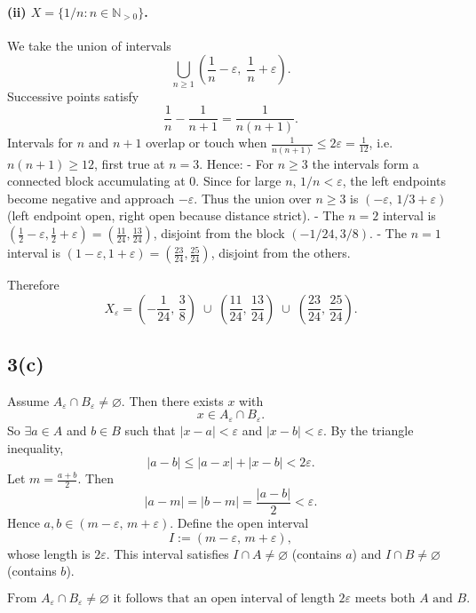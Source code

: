 \documentclass[12pt,a4paper]{article}
\theoremstyle{definition}
\theoremstyle{remark}
\begin{document}
\paragraph{(ii) \(X = \{1/n : n\in\mathbb{N}_{>0}\}\).}
We take the union of intervals
\[
\bigcup_{n\ge 1} \left( \frac{1}{n} - \varepsilon,\; \frac{1}{n} + \varepsilon \right).
\]
Successive points satisfy
\[
\frac{1}{n} - \frac{1}{n+1} = \frac{1}{n(n+1)}.
\]
Intervals for \(n\) and \(n+1\) overlap or touch when \(\frac{1}{n(n+1)} \le 2\varepsilon = \frac{1}{12}\), i.e. \(n(n+1)\ge 12\), first true at \(n=3\).
Hence:
- For \(n\ge 3\) the intervals form a connected block accumulating at \(0\). Since for large \(n\), \(1/n < \varepsilon\), the left endpoints become negative and approach \(-\varepsilon\). Thus the union over \(n\ge 3\) is \((- \varepsilon,\, 1/3 + \varepsilon)\) (left endpoint open, right open because distance strict).
- The \(n=2\) interval is \(\left(\frac{1}{2}-\varepsilon,\frac{1}{2}+\varepsilon\right) = \left(\frac{11}{24},\frac{13}{24}\right)\), disjoint from the block \((-1/24, 3/8)\).
- The \(n=1\) interval is \(\left(1-\varepsilon,1+\varepsilon\right) = \left(\frac{23}{24},\frac{25}{24}\right)\), disjoint from the others.

Therefore
\[
X_\varepsilon = \left(-\frac{1}{24},\,\frac{3}{8}\right) \;\cup\; \left(\frac{11}{24},\,\frac{13}{24}\right) \;\cup\; \left(\frac{23}{24},\,\frac{25}{24}\right).
\]

\subsection*{3(c)}
Assume \(A_\varepsilon \cap B_\varepsilon \neq \varnothing\). Then there exists \(x\) with
\[
x \in A_\varepsilon \cap B_\varepsilon.
\]
So \(\exists a\in A\) and \(b\in B\) such that \(|x-a|<\varepsilon\) and \(|x-b|<\varepsilon\). By the triangle inequality,
\[
|a-b| \le |a-x| + |x-b| < 2\varepsilon.
\]
Let \(m = \frac{a+b}{2}\). Then
\[
|a-m| = |b-m| = \frac{|a-b|}{2} < \varepsilon.
\]
Hence \(a,b \in (m-\varepsilon,\, m+\varepsilon)\). Define the open interval
\[
I := (m-\varepsilon,\, m+\varepsilon),
\]
whose length is \(2\varepsilon\). This interval satisfies \(I \cap A \neq \varnothing\) (contains \(a\)) and \(I \cap B \neq \varnothing\) (contains \(b\)).

\[
\boxed{\text{From } A_\varepsilon \cap B_\varepsilon \neq \varnothing \text{ it follows that an open interval of length } 2\varepsilon \text{ meets both } A \text{ and } B.}
\]
\end{document}
